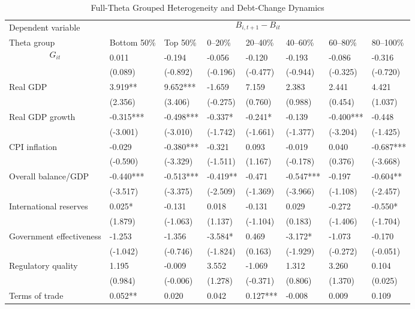 \begin{table}[H]\centering
\begin{threeparttable}
\caption{Full-Theta Grouped Heterogeneity and Debt-Change Dynamics}
\label{tab:theta_group_heterogeneity_debt}
\scriptsize
\begin{tabularx}{\textwidth}{lYYYYYYY}
\toprule
Dependent variable &  \\
\cmidrule(lr){2-8}
Theta group & Bottom 50\% & Top 50\% & 0--20\% & 20--40\% & 40--60\% & 60--80\% & 80--100\% \\
\midrule
$$G_{it}$$ & 0.011 & -0.194 & -0.056 & -0.120 & -0.193 & -0.086 & -0.316 \\
  & (0.089) & (-0.892) & (-0.196) & (-0.477) & (-0.944) & (-0.325) & (-0.720) \\
Real GDP & 3.919** & 9.652*** & -1.659 & 7.159 & 2.383 & 2.441 & 4.421 \\
  & (2.356) & (3.406) & (-0.275) & (0.760) & (0.988) & (0.454) & (1.037) \\
Real GDP growth & -0.315*** & -0.498*** & -0.337* & -0.241* & -0.139 & -0.400*** & -0.448 \\
  & (-3.001) & (-3.010) & (-1.742) & (-1.661) & (-1.377) & (-3.204) & (-1.425) \\
CPI inflation & -0.029 & -0.380*** & -0.321 & 0.093 & -0.019 & 0.040 & -0.687*** \\
  & (-0.590) & (-3.329) & (-1.511) & (1.167) & (-0.178) & (0.376) & (-3.668) \\
Overall balance/GDP & -0.440*** & -0.513*** & -0.419** & -0.471 & -0.547*** & -0.197 & -0.604** \\
  & (-3.517) & (-3.375) & (-2.509) & (-1.369) & (-3.966) & (-1.108) & (-2.457) \\
International reserves & 0.025* & -0.131 & 0.018 & -0.131 & 0.029 & -0.272 & -0.550* \\
  & (1.879) & (-1.063) & (1.137) & (-1.104) & (0.183) & (-1.406) & (-1.704) \\
Government effectiveness & -1.253 & -1.356 & -3.584* & 0.469 & -3.172* & -1.073 & -0.170 \\
  & (-1.042) & (-0.746) & (-1.824) & (0.163) & (-1.929) & (-0.272) & (-0.051) \\
Regulatory quality & 1.195 & -0.009 & 3.552 & -1.069 & 1.312 & 3.260 & 0.104 \\
  & (0.984) & (-0.006) & (1.278) & (-0.371) & (0.806) & (1.370) & (0.025) \\
Terms of trade & 0.052** & 0.020 & 0.042 & 0.127*** & -0.008 & 0.009 & 0.109 \\

\end{tabularx}
\end{threeparttable}
\end{table}
